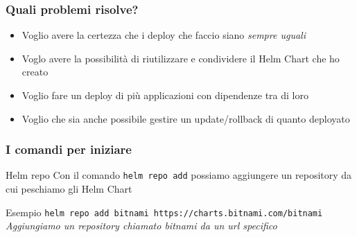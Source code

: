 \documentclass{beamer}
\begin{document}
 \begin{frame}
 \frametitle{Quali problemi risolve?}
 \begin{itemize}
     \item Voglio avere la certezza che i deploy che faccio siano \textit{sempre uguali}
     \item Voglo avere la possibilità di riutilizzare e condividere il  Helm Chart che ho creato
     \item Voglio fare un deploy di più applicazioni con dipendenze tra di loro
     \item Voglio che sia anche possibile gestire un update/rollback di quanto deployato
 \end{itemize}
 \end{frame}
 
 \begin{frame}[allowframebreaks]
 \frametitle{I comandi per iniziare}
 \begin{block}{Helm repo}
  Con il comando \lstinline[language=bash]{helm repo add} possiamo aggiungere un repository da cui peschiamo gli Helm Chart
  \end{block}
  \framebreak
  \begin{block}{Esempio}
  \lstinline[language=bash]{helm repo add bitnami https://charts.bitnami.com/bitnami} \newline \textit{Aggiungiamo un repository chiamato bitnami da un url specifico}
  \end{block}
  
 \end{frame}
 
\end{document}
